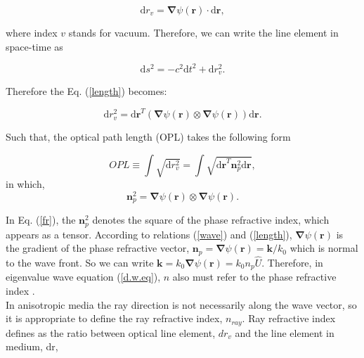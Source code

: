 \documentclass[9pt,twocolumn,twoside]{osajnl}
\begin{document}
\begin{equation}\label{length}
\mathrm{d}{r_{v}}=\boldsymbol{\nabla}{\psi(\mathbf{r})}\cdot \mathbf{\mathrm{d}{r}},
\end{equation}

 where index $v$ stands for vacuum.  Therefore, we can write the line element in space-time as 

\begin{equation}
\mathrm{d}s^{2}=-c^{2}\mathrm{d}{t}^{2}+{\mathrm{d}}{r^{2}_{v}}.
\end{equation}

Therefore the Eq. (\ref{length}) becomes:

\begin{equation}\label{a}
{\mathrm{d}}{r^{2}_{v}}={\mathrm{d}{\mathbf{r}}}^{T}\left(\boldsymbol{\nabla}{\psi(\mathbf{r})}\otimes\boldsymbol{\nabla}{\psi(\mathbf{r})}\right)\mathbf{\mathrm{d}{r}}.
\end{equation}

Such that, the optical path length (OPL) takes the following form

\begin{equation}
OPL\equiv\int{\sqrt{{\mathrm{d}}{r^{2}_{v}}}}=\int{\sqrt{{\mathrm{d}{\mathbf{r}}}^{T}\mathbf{n}_{p}^{2}\mathbf{\mathrm{d}{r}}}},
\end{equation}
in which, 
\begin{equation}\label{fr}
\mathbf{n}_{p}^{2}=\boldsymbol{\nabla}{\psi(\mathbf{r})}\otimes\boldsymbol{\nabla}{\psi(\mathbf{r})}.
\end{equation}

In Eq. (\ref{fr}), the $\mathbf{n}_{p}^{2}$ denotes the square of the phase refractive index, which appears as a tensor.  According to relations (\ref{wave}) and (\ref{length}),  $\boldsymbol{\nabla}{\psi(\mathbf{r})}$ is the gradient of the phase refractive vector, $\mathbf{n}_{p}=\boldsymbol{\nabla}{\psi(\mathbf{r})}=\mathbf{k}/k_0$ which is normal to the wave front. So we can write $\mathbf{k}=k_{0}\boldsymbol{\nabla}{\psi(\mathbf{r})}=k_{0}n_{p}\hat{U}$. Therefore, in eigenvalue wave equation (\ref{d.w.eq}),  $n$ also must refer to the phase refractive index \cite{born1999principles}.\\


In anisotropic media the ray direction is not necessarily along the wave vector, so it is appropriate to define the ray refractive index, $n_{ray}$. Ray refractive index defines as the ratio between optical line element, $dr_{v}$ and the line element in medium, dr, \cite{born1999principles}
\end{document}
